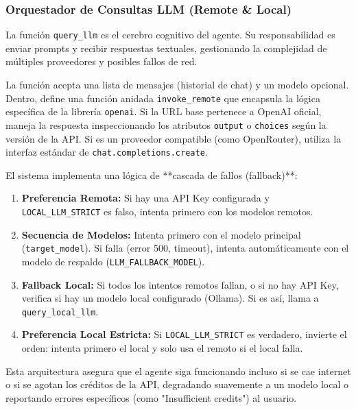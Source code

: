 \documentclass[letterpaper,12pt]{article}
\begin{document}
\subsubsection{Orquestador de Consultas LLM (Remote \& Local)}

La función \texttt{query\_llm} es el cerebro cognitivo del agente. Su responsabilidad es enviar prompts y recibir respuestas textuales, gestionando la complejidad de múltiples proveedores y posibles fallos de red.

La función acepta una lista de mensajes (historial de chat) y un modelo opcional.
Dentro, define una función anidada \texttt{invoke\_remote} que encapsula la lógica específica de la librería \texttt{openai}. Si la URL base pertenece a OpenAI oficial, maneja la respuesta inspeccionando los atributos \texttt{output} o \texttt{choices} según la versión de la API. Si es un proveedor compatible (como OpenRouter), utiliza la interfaz estándar de \texttt{chat.completions.create}.

El sistema implementa una lógica de **cascada de fallos (fallback)**:
\begin{enumerate}
    \item \textbf{Preferencia Remota:} Si hay una API Key configurada y \texttt{LOCAL\_LLM\_STRICT} es falso, intenta primero con los modelos remotos.
    \item \textbf{Secuencia de Modelos:} Intenta primero con el modelo principal (\texttt{target\_model}). Si falla (error 500, timeout), intenta automáticamente con el modelo de respaldo (\texttt{LLM\_FALLBACK\_MODEL}).
    \item \textbf{Fallback Local:} Si todos los intentos remotos fallan, o si no hay API Key, verifica si hay un modelo local configurado (Ollama). Si es así, llama a \texttt{query\_local\_llm}.
    \item \textbf{Preferencia Local Estricta:} Si \texttt{LOCAL\_LLM\_STRICT} es verdadero, invierte el orden: intenta primero el local y solo usa el remoto si el local falla.
\end{enumerate}

Esta arquitectura asegura que el agente siga funcionando incluso si se cae internet o si se agotan los créditos de la API, degradando suavemente a un modelo local o reportando errores específicos (como "Insufficient credits") al usuario.
\end{document}
